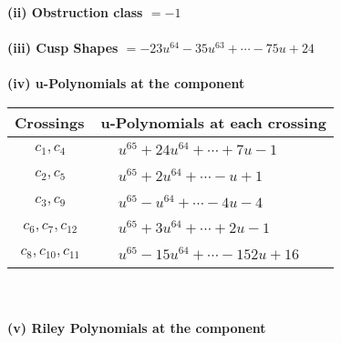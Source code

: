 \documentclass[1p]{elsarticle_modified}
\theoremstyle{definition}
\begin{document}
\flushleft \textbf{(ii) Obstruction class $= -1$}\\~\\
\flushleft \textbf{(iii) Cusp Shapes $= -23 u^{64}-35 u^{63}+\cdots-75 u+24$}\\~\\
\newpage\renewcommand{\arraystretch}{1}
\flushleft \textbf{(iv) u-Polynomials at the component}\newline \\
\begin{tabular}{m{50pt}|m{274pt}}
Crossings & \hspace{64pt}u-Polynomials at each crossing \\
\hline $$\begin{aligned}c_{1},c_{4}\end{aligned}$$&$\begin{aligned}
&u^{65}+24 u^{64}+\cdots+7 u-1
\end{aligned}$\\
\hline $$\begin{aligned}c_{2},c_{5}\end{aligned}$$&$\begin{aligned}
&u^{65}+2 u^{64}+\cdots- u+1
\end{aligned}$\\
\hline $$\begin{aligned}c_{3},c_{9}\end{aligned}$$&$\begin{aligned}
&u^{65}- u^{64}+\cdots-4 u-4
\end{aligned}$\\
\hline $$\begin{aligned}c_{6},c_{7},c_{12}\end{aligned}$$&$\begin{aligned}
&u^{65}+3 u^{64}+\cdots+2 u-1
\end{aligned}$\\
\hline $$\begin{aligned}c_{8},c_{10},c_{11}\end{aligned}$$&$\begin{aligned}
&u^{65}-15 u^{64}+\cdots-152 u+16
\end{aligned}$\\
\hline
\end{tabular}\\~\\
\newpage\renewcommand{\arraystretch}{1}
\flushleft \textbf{(v) Riley Polynomials at the component}\newline \\
\end{document}
